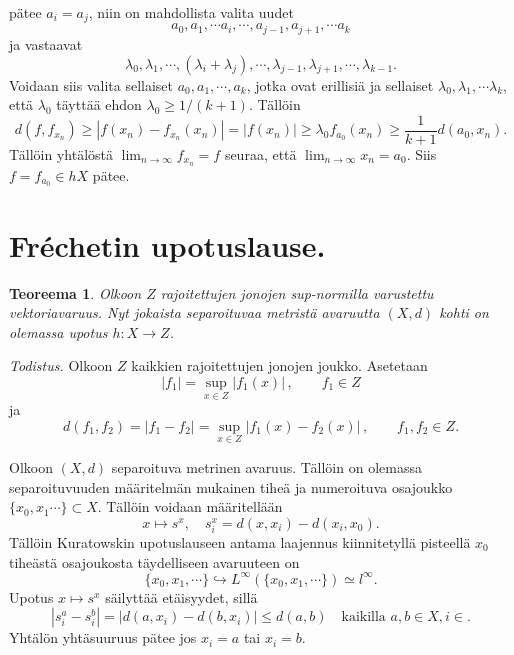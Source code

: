 \documentclass[12pt,a4paper,reqno]{amsart}
\newtheorem{teoreema}[maar]{Teoreema}
\begin{document}
pätee $ a_i=a_j$, niin on mahdollista valita uudet $$a_0,a_1,\cdots a_i,\cdots, a_{j-1},a_{j+1},\cdots a_{k}$$ ja vastaavat $$\lambda_0,\lambda_1,\cdots, (\lambda_i+\lambda_j),\cdots ,
\lambda_{j-1},
\lambda_{j+1},\cdots, \lambda_{k-1}.$$ 
Voidaan siis valita sellaiset $a_0,a_1,\cdots, a_k$, jotka ovat erillisiä ja sellaiset $\lambda_0,\lambda_1,\cdots \lambda_k$, että $\lambda_0$ täyttää ehdon $\lambda_0\geq 1/(k+1)$. Tällöin $$d(f,f_{x_n})\geq |f(x_n)-f_{x_n}(x_n)|=|f(x_n)|\geq \lambda_0 f_{a_0}(x_n)\geq \dfrac{1}{k+1}d(a_0,x_n).$$
Tällöin yhtälöstä $\lim_{n\rightarrow\infty} f_{x_n}=f$ seuraa, että $\lim_{n\rightarrow\infty }x_n=a_0$. Siis $ f=f_{a_0}\in hX$ pätee.


\newpage
\section{Fréchetin upotuslause.} %
\begin{teoreema}
Olkoon $Z$ rajoitettujen jonojen sup-normilla varustettu vektoriavaruus. Nyt jokaista separoituvaa metristä avaruutta $(X,d)$ kohti on olemassa upotus $h\colon X\rightarrow Z$. 
\end{teoreema}
\vspace{0.5cm}

\emph{Todistus.} Olkoon $Z$ kaikkien rajoitettujen jonojen joukko. Asetetaan
$$|f_1|=\sup_{x\in Z} |f_1(x)| \, , \qquad f_1\in Z$$
ja
$$d(f_1,f_2)=|f_1-f_2| = \sup_{x\in Z} |f_1 (x)-f_2 (x)| \, , \qquad f_1, f_2 \in Z .$$

Olkoon $(X,d)$ separoituva metrinen avaruus. Tällöin on olemassa separoituvuuden määritelmän mukainen tiheä ja numeroituva osajoukko $\{x_0,x_1\cdots \}\subset X$. Tällöin voidaan määritellään 
$$x\mapsto s^x,\quad s^x_i=d(x,x_i)-d(x_i,x_0).$$
Tällöin Kuratowskin upotuslauseen antama laajennus kiinnitetyllä pisteellä $x_0$ tiheästä osajoukosta täydelliseen avaruuteen on
$$\{x_0,x_1,\cdots\}\hookrightarrow L^\infty (\{x_0,x_1,\cdots\})\simeq l^\infty. $$
Upotus $x\mapsto s^x$ säilyttää etäisyydet, sillä 
$$|s^a_i-s^b_i|=|d(a,x_i)-d(b,x_i)|\leq d(a,b)\quad \text{kaikilla } a,b\in X,i\in .$$
Yhtälön yhtäsuuruus pätee jos $x_i=a$ tai $x_i=b$. 
\end{document}
